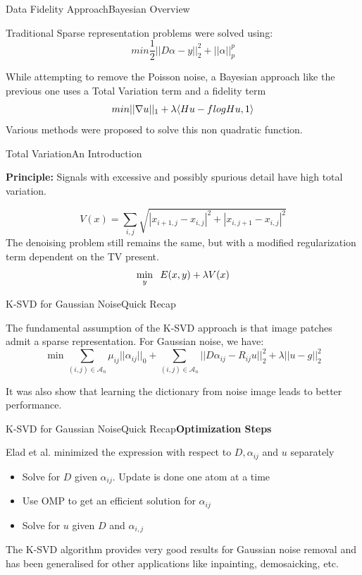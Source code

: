 \documentclass{beamer}
\begin{document}
\begin{frame}{Data Fidelity Approach}{Bayesian Overview}

Traditional Sparse representation problems were solved using:
\[
    min \frac{1}{2} ||D\alpha - y ||_2^2 + ||\alpha||^p_p
\]

While attempting to remove the Poisson noise, a Bayesian approach like the previous one uses a Total Variation term and a fidelity term
\[
    min ||\nabla u||_1 + \lambda\langle Hu-f\hspace{0.25pt}log Hu,1\rangle
\]
Various methods were proposed to solve this non quadratic function. 
    
\end{frame}

\begin{frame}{Total Variation}{An Introduction}

\textbf{Principle: } Signals with excessive and possibly spurious detail have high total variation.


\[
V(x) = \sum_{i,j}{} \sqrt{|x_{i+1,j} - x_{i,j}|^2 + |x_{i,j+1} - x_{i,j}|^2}
\]
The denoising problem still remains the same, but with a modified regularization term dependent on the TV present.
\[
\min_{y} \hspace{0.2cm} E(x,y) + \lambda V(x)
\]


\end{frame}

\begin{frame}{K-SVD for Gaussian Noise}{Quick Recap}

The fundamental assumption of the K-SVD approach is that image patches admit a sparse representation. For Gaussian noise, we have:
\[\min \sum_{(i,j) \in \mathcal{A}_n}{} \mu_{ij}||\alpha_{ij}||_0 + \sum_{(i,j) \in \mathcal{A}_n}{} ||D\alpha_{ij} - R_{ij}u||^2_2  + \lambda ||u-g||^2_2\]

It was also show that learning the dictionary from noise image leads to better performance. 
\end{frame}

\begin{frame}{K-SVD for Gaussian Noise}{Quick Recap}{\textbf{Optimization Steps}}

Elad et al. minimized the expression with respect to $D, \alpha_{ij}$ and $u$ separately
\begin{itemize}
    \item Solve for $D$ given ${\alpha_{ij}}$. Update is done one atom at a time
    \item Use OMP to get an efficient solution for ${\alpha_{ij}}$
    \item Solve for $u$ given $D$ and $\alpha_{i,j}$
\end{itemize}

The K-SVD algorithm provides very good results for Gaussian noise removal and has been generalised for other applications like inpainting, demosaicking, etc.
    
\end{frame}
\end{document}
